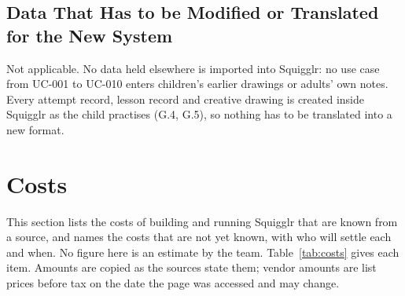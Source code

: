 \documentclass[12pt]{article}
\renewcommand{\_}{\textunderscore\allowbreak}%
\begin{document}
\subsection{Data That Has to be Modified or Translated for the New System}
Not applicable. No data held elsewhere is imported into Squigglr: no use case
from UC-001 to UC-010 enters children's earlier drawings or adults' own notes.
Every attempt record, lesson record and creative drawing is created inside
Squigglr as the child practises (G.4, G.5), so nothing has to be translated into
a new format.

\section{Costs}
\label{sec:costs}
This section lists the costs of building and running Squigglr that are known
from a source, and names the costs that are not yet known, with who will settle
each and when. No figure here is an estimate by the team. Table~\ref{tab:costs}
gives each item. Amounts are copied as the sources state them; vendor amounts
are list prices before tax on the date the page was accessed and may change.
\end{document}
